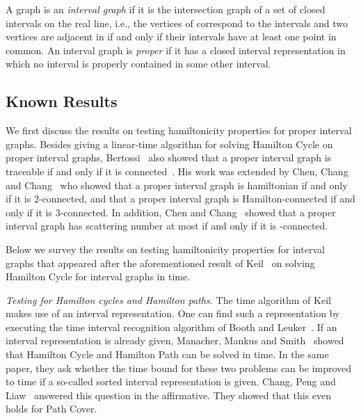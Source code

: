 \documentclass{llncs}
\begin{document}
A graph  is an {\it interval graph} if it is the intersection graph of a set of closed intervals on the real line, i.e., the vertices of  correspond to the intervals and two vertices are adjacent in  if and only if their intervals have at least one point in common. An interval graph is {\it proper} if it has a closed interval representation in which no interval is properly contained in some other interval. 

\subsection{Known Results}\label{s-known}

We first discuss the results on testing hamiltonicity properties for proper interval graphs. Besides giving a linear-time algorithm for solving {\sc Hamilton Cycle} on proper interval graphs, Bertossi~\cite{Be83} also showed that a proper interval graph is traceable if and only if it is connected~\cite{Be83}. His work was extended by Chen, Chang and Chang~\cite{CCC97} who showed that
a proper interval graph is hamiltonian if and only if it is 2-connected, and that a proper interval graph is Hamilton-connected if and only if it is 3-connected. 
In addition, Chen and Chang~\cite{CC96} showed that a proper interval graph has scattering number at most  if and only if it is -connected.

Below we survey the results on testing hamiltonicity properties for interval graphs that appeared after the aforementioned result of Keil~\cite{Ke85} on solving {\sc Hamilton Cycle} for interval graphs  in   time.

\medskip
\noindent
{\it Testing for Hamilton cycles and Hamilton paths.} 
The  time algorithm of Keil~\cite{Ke85}
makes use of an interval representation. One can find such a representation by executing the  time interval recognition algorithm of 
Booth and Leuker~\cite{BL76}. If an interval representation is already given,
Manacher, Mankus and Smith~\cite{MMS90} showed that {\sc Hamilton Cycle} and {\sc Hamilton Path} can be solved in  time. In the same
paper, they ask whether the time bound for these two problems can be improved to  time if a so-called sorted interval representation is given.
Chang, Peng and Liaw~\cite{CPL99} answered this question in the affirmative. They showed that this even holds for {\sc Path Cover}.
\end{document}
